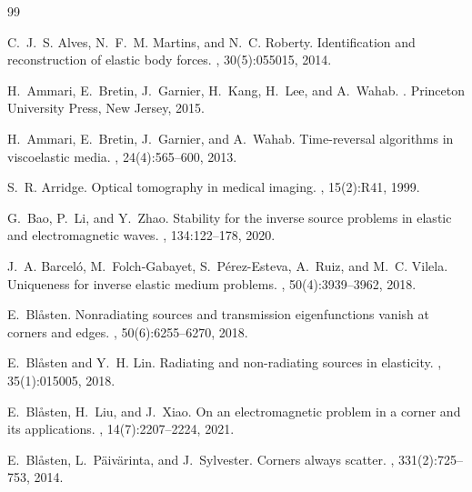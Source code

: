 \documentclass[11pt,reqno,oneside]{amsart}
\theoremstyle{definition}
\theoremstyle{remark}
\numberwithin{equation}{section}
\numberwithin{equation}{section}
\theoremstyle{remark}
\begin{document}
%
%
\begin{thebibliography}{99}
	
	C.~J.~S. Alves, N.~F.~M. Martins, and N.~C. Roberty.
	\newblock Identification and reconstruction of elastic body forces.
	, 30(5):055015, 2014.
	
	H.~Ammari, E.~Bretin, J.~Garnier, H.~Kang, H.~Lee, and A.~Wahab.
	.
	\newblock Princeton University Press, New Jersey, 2015.
	
	H.~Ammari, E.~Bretin, J.~Garnier, and A.~Wahab.
	\newblock Time-reversal algorithms in viscoelastic media.
	, 24(4):565--600, 2013.
	
	S.~R. Arridge.
	\newblock Optical tomography in medical imaging.
	, 15(2):R41, 1999.
	
	G.~Bao, P.~Li, and Y.~Zhao.
	\newblock Stability for the inverse source problems in elastic and
	electromagnetic waves.
	,
	134:122--178, 2020.
	
	J.~A. Barcel{\'o}, M.~Folch-Gabayet, S.~P{\'e}rez-Esteva, A.~Ruiz, and M.~C.
	Vilela.
	\newblock Uniqueness for inverse elastic medium problems.
	, 50(4):3939--3962, 2018.
	
	E.~Bl{\aa}sten.
	\newblock Nonradiating sources and transmission eigenfunctions vanish at
	corners and edges.
	, 50(6):6255--6270, 2018.
	
	E.~Bl{\aa}sten and Y.~H. Lin.
	\newblock Radiating and non-radiating sources in elasticity.
	, 35(1):015005, 2018.
	
	E.~Bl{\aa}sten, H.~Liu, and J.~Xiao.
	\newblock On an electromagnetic problem in a corner and its applications.
	, 14(7):2207--2224, 2021.
	
	E.~Bl{\aa}sten, L.~P{\"a}iv{\"a}rinta, and J.~Sylvester.
	\newblock Corners always scatter.
	, 331(2):725--753, 2014.
	

\end{thebibliography}
\end{document}

